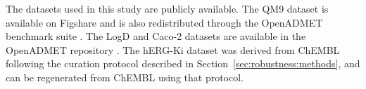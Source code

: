 The datasets used in this study are publicly available. The QM9 dataset is available on Figshare \citep{qm9_dataset} and is also redistributed through the OpenADMET benchmark suite \citep{Ramakrishnan2014, openadmet}. The LogD and Caco-2 datasets are available in the OpenADMET repository \citep{openadmet}. The hERG-Ki dataset was derived from ChEMBL \citep{Zdrazil2023} following the curation protocol described in Section~\ref{sec:robustness:methods}, and can be regenerated from ChEMBL using that protocol.







